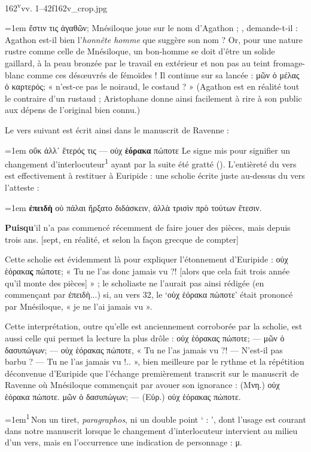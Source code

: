\documentclass{thesmo}
\begin{document}
\begin{folio}{162\textsuperscript{v}}{vv. 1–42}{f162v_crop.jpg}
\begin{texte}
{\par{\leftskip=1em ἔστιν τις ἀγαθῶν;}
Mnésiloque joue sur le nom d'Agathon ; , demande-t-il : Agathon est-il bien l'\textit{honnête homme} que suggère son nom ? Or, pour une nature rustre comme celle de Mnésiloque, un bon-homme se doit d'être un solide gaillard, à la peau bronzée par le travail en extérieur et non pas au teint fromage-blanc comme ces désœuvrés de fémoïdes ! 
Il continue sur sa lancée : μῶν ὁ μέλας ὁ καρτερός; « n'est-ce pas le noiraud, le costaud ? »
(Agathon est en réalité tout le contraire d'un rustaud ; Aristophane donne ainsi facilement à rire à son public aux dépens de l'original bien connu.)\par 
Le vers suivant est écrit ainsi dans le manuscrit de Ravenne :
\par{\leftskip=1em οὔκ ἀλλ᾽ ἕτερός τις --- οὐχ \textbf{ἑόρακα} πώποτε}
Le signe mis pour signifier un changement d'interlocuteur\textsuperscript{1} ayant par la suite été gratté ().
L'entièreté du vers est effectivement à restituer à Euripide : une scholie écrite juste au-dessus du vers l'atteste : 
\par{\leftskip=1em \textbf{ἐπειδὴ} οὐ πάλαι ἤρξατο διδάσκειν, ἀλλὰ τρισὶν πρὸ τούτων ἔτεσιν.\par 
\textbf{Puisqu}'il n'a pas commencé récemment de faire jouer des pièces, mais depuis trois ans. [sept, en réalité, et selon la façon grecque de compter]}
Cette scholie est évidemment là pour expliquer l'étonnement d'Euripide : οὐχ ἑόρακα\textbf{ς} πώποτε; « Tu ne l'as donc jamais vu ?! [alors que cela fait trois année qu'il monte des pièces] » ; le scholiaste ne l'aurait pas ainsi rédigée (en commençant par ἐπειδὴ...) si, au vers 32, le `οὐχ ἑόρακα πώποτε' était prononcé par Mnésiloque, « je ne l'ai jamais vu ».\par 
Cette interprétation, outre qu'elle est anciennement corroborée par la scholie, est aussi celle qui permet la lecture la plus drôle : οὐχ ἑόρακας πώποτε; --- μῶν ὁ δασυπώγων; --- οὐχ ἑόρακας πώποτε, « Tu ne l'as jamais vu ?! --- N'est-il pas barbu ? --- Tu ne l'as jamais vu !.. », bien meilleure par le rythme et la répétition déconvenue d'Euripide que l'échange premièrement transcrit sur le manuscrit de Ravenne où Mnésiloque commençait par avouer son ignorance : (Μνη.) οὐχ ἑόρακα πώποτε. μῶν ὁ δασυπώγων; --- (Εὐρ.) οὐχ ἑόρακας πώποτε.
\par{\fontsize{7.6}{9.4}\selectfont\leftskip=1em\noindent \textsuperscript{1}\,Non un tiret, \textit{paragraphos}, ni un double point ` : ', dont l'usage est courant dans notre manuscrit lorsque le changement d'interlocuteur intervient au milieu d'un vers, mais en l'occurrence une indication de personnage : μ.\par}}

\end{texte}
\end{folio}
\end{document}
